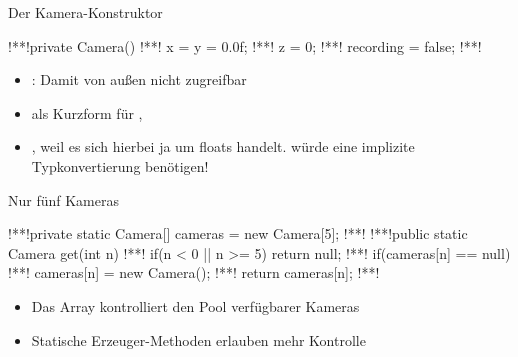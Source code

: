 {\SidebarSolution
\begin{frame}[fragile,c]{Der Kamera-Konstruktor}
\begin{plainjava}
!**!private Camera() {
!**!   x = y = 0.0f;
!**!   z = 0;
!**!   recording = false;
!**!}
\end{plainjava}\medskip
\begin{itemize}
   \item<6-> : Damit von außen nicht zugreifbar
   \item<7->  als Kurzform für ,  
   \item<9-> , weil es sich hierbei ja um floats handelt.  würde eine implizite Typkonvertierung benötigen!
\end{itemize}
%
\end{frame}

\begin{frame}[fragile,c]{Nur fünf Kameras}
\begin{plainjava}
!**!private static Camera[] cameras = new Camera[5];
!**!
!**!public static Camera get(int n) {
!**!   if(n < 0 || n >= 5) return null;
!**!   if(cameras[n] == null)
!**!      cameras[n] = new Camera();
!**!   return cameras[n];
!**!}
\end{plainjava}
\bigskip
\begin{itemize}
   \itemsep6pt
   \item<7-> Das Array kontrolliert den Pool verfügbarer Kameras
   \item<8-> Statische Erzeuger-Methoden erlauben mehr Kontrolle
\end{itemize}
\end{frame}
\SidebarReset

}
